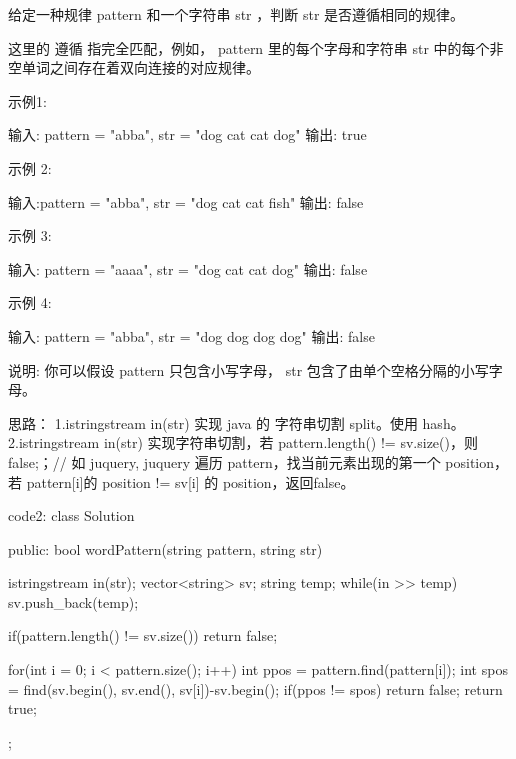 给定一种规律 pattern 和一个字符串 str ，判断 str 是否遵循相同的规律。

这里的 遵循 指完全匹配，例如， pattern 里的每个字母和字符串 str 中的每个非空单词之间存在着双向连接的对应规律。

示例1:

输入: pattern = "abba", str = "dog cat cat dog"
输出: true

示例 2:

输入:pattern = "abba", str = "dog cat cat fish"
输出: false

示例 3:

输入: pattern = "aaaa", str = "dog cat cat dog"
输出: false

示例 4:

输入: pattern = "abba", str = "dog dog dog dog"
输出: false

说明:
你可以假设 pattern 只包含小写字母， str 包含了由单个空格分隔的小写字母。    

























思路：
1.istringstream in(str) 实现 java 的 字符串切割 split。使用 hash。
2.istringstream in(str) 实现字符串切割，若 pattern.length() != sv.size()，则 false;；// 如 juquery, juquery
遍历 pattern，找当前元素出现的第一个 position，若 pattern[i]的 position != sv[i] 的 position，返回false。




















code2:
class Solution {
public:
    bool wordPattern(string pattern, string str) {
        istringstream in(str);
        vector<string> sv;
        string temp;
        while(in >> temp) sv.push_back(temp);
        
        if(pattern.length() != sv.size()) return false;
        
        for(int i = 0; i < pattern.size(); i++)
        {
            int ppos = pattern.find(pattern[i]);
            int spos = find(sv.begin(), sv.end(), sv[i])-sv.begin();
            if(ppos != spos) return false;
        }
        return true;
    }
};













